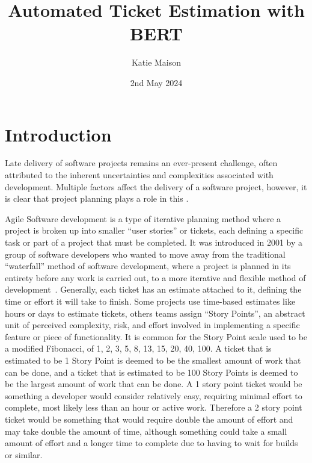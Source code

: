 \documentclass{UoYCSproject}
\author{Katie Maison}
\title{Automated Ticket Estimation with BERT}
\date{2nd May 2024}
\begin{document}
\maketitle
\listoffigures
\listoftables



    \chapter{Introduction}
    \label{ch:introduction}
    \setcounter{page}{1}


    Late delivery of software projects remains an ever-present challenge, often attributed to the inherent uncertainties and complexities associated with development.
    Multiple factors affect the delivery of a software project, however, it is clear that project planning plays a role in this \cite{CHOW2008961}. \par
    Agile Software development is a type of iterative planning method where a project is broken up into smaller “user stories” or tickets, each defining a specific task or part of a project that must be completed.
    It was introduced in 2001 by a group of software developers who wanted to move away from the traditional “waterfall” method of software development, where a project is planned in its entirety before any work is carried out, to a more iterative and flexible method of development~\cite{beck2001agile}.
    Generally, each ticket has an estimate attached to it, defining the time or effort it will take to finish.
    Some projects use time-based estimates like hours or days to estimate tickets, others teams assign “Story Points”, an abstract unit of perceived complexity, risk, and effort involved in implementing a specific feature or piece of functionality.
    It is common for the Story Point scale used to be a modified Fibonacci, of 1, 2, 3, 5, 8, 13, 15, 20, 40, 100. \cite{scrumFib}
    A ticket that is estimated to be 1 Story Point is deemed to be the smallest amount of work that can be done, and a ticket that is estimated to be 100 Story Points is deemed to be the largest amount of work that can be done.
    A 1 story point ticket would be something a developer would consider relatively easy, requiring minimal effort to complete, most likely less than an hour or active work.
    Therefore a 2 story point ticket would be something that would require double the amount of effort and may take double the amount of time, although something could take a small amount of effort and a longer time to complete due to having to wait for builds or similar.
\end{document}

